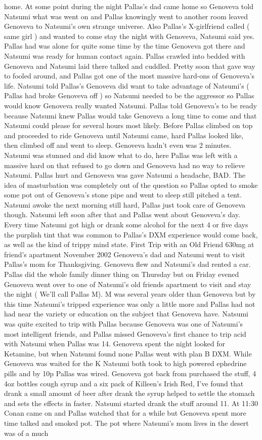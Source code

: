 \documentclass[12pt]{book}
\begin{document}
home. At some point during the night Pallas's dad came home so Genoveva told Natsumi what was went on and Pallas knowingly went to another room leaved Genoveva to Natsumi's own strange universe. Also Pallas's X-girlfriend called ( same girl ) and wanted to come stay the night with Genoveva, Natsumi said yes. Pallas had was alone for quite some time by the time Genoveva got there and Natsumi was ready for human contact again. Pallas crawled into bedded with Genoveva and Natsumi laid there talked and cuddled. Pretty soon that gave way to fooled around, and Pallas got one of the most massive hard-ons of Genoveva's life. Natsumi told Pallas's Genoveva did want to take advantage of Natsumi's ( Pallas had broke Genoveva off ) so Natsumi needed to be the aggressor so Pallas would know Genoveva really wanted Natsumi. Pallas told Genoveva's to be ready because Natsumi knew Pallas would take Genoveva a long time to come and that Natsumi could please for several hours most likely. Before Pallas climbed on top and proceeded to ride Genoveva until Natsumi came, hard Pallas looked like, then climbed off and went to sleep. Genoveva hadn't even was 2 minutes. Natsumi was stunned and did know what to do, here Pallas was left with a massive hard on that refused to go down and Genoveva had no way to relieve Natsumi. Pallas hurt and Genoveva was gave Natsumi a headache, BAD. The idea of masturbation was completely out of the question so Pallas opted to smoke some pot out of Genoveva's stone pipe and went to sleep still pitched a tent. Natsumi awoke the next morning still hard, Pallas just took care of Genoveva though. Natsumi left soon after that and Pallas went about Genoveva's day. Every time Natsumi got high or drank some alcohol for the next 4 or five days the purplish tint that was common to Pallas's DXM experience would come back, as well as the kind of trippy mind state. First Trip with an Old Friend 630mg at friend's apartment November 2002  Genoveva's dad and Natsumi went to visit Pallas's mom for Thanksgiving. Genoveva flew and Natsumi's dad rented a car. Pallas did the whole family dinner thing on Thursday but on Friday evened Genoveva went over to one of Natsumi's old friends apartment to visit and stay the night ( We'll call Pallas M). M was several years older than Genoveva but by this time Natsumi's tripped experience was only a little more and Pallas had not had near the variety or education on the subject that Genoveva have. Natsumi was quite excited to trip with Pallas because Genoveva was one of Natsumi's most intelligent friends, and Pallas missed Genoveva's first chance to trip acid with Natsumi when Pallas was 14. Genoveva spent the night looked for Ketamine, but when Natsumi found none Pallas went with plan B DXM. While Genoveva was waited for the K Natsumi both took to high powered ephedrine pills and by 10p Pallas was wired. Genoveva got back from purchased the stuff, 4 4oz bottles cough syrup and a six pack of Killeen's Irish Red, I've found that drank a small amount of beer after drank the syrup helped to settle the stomach and sets the effects in faster. Natsumi started drank the stuff around 11. At 11:30 Conan came on and Pallas watched that for a while but Genoveva spent more time talked and smoked pot. The pot where Natsumi's mom lives in the desert was of a much 
\end{document}
